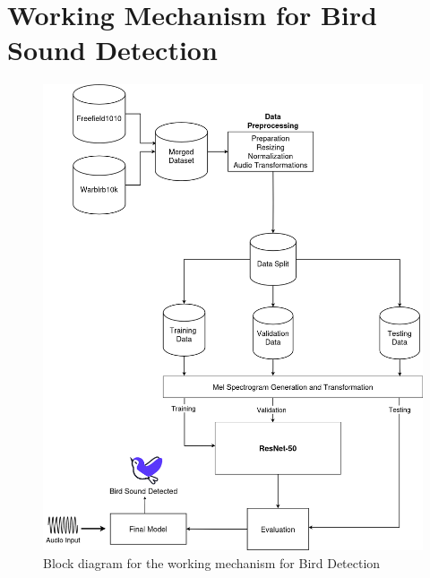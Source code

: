 \section{Working Mechanism for Bird Sound Detection}
      \begin{figure}[h!]
            \centering
            \includegraphics[scale=0.33]{images/MajorProject-Detection.png}
            \caption{Block diagram for the working mechanism for Bird Detection}%
      \end{figure}

